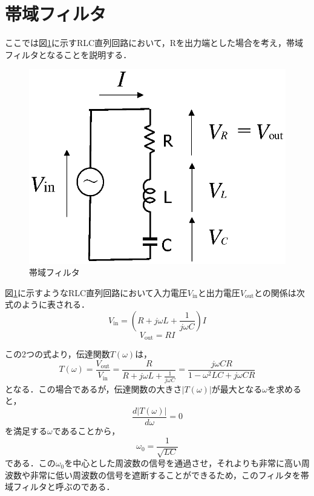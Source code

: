 \section{帯域フィルタ}

ここでは図\ref{fig:rlc01}に示すRLC直列回路において，Rを出力端とした場合を考え，帯域フィルタとなることを説明する．

\begin{figure}[H]
\begin{center}
\includegraphics[width=.4\textwidth]{fig/rlc0.eps}
\end{center}
\caption{帯域フィルタ}
\label{fig:rlc01}
\end{figure}

図\ref{fig:rlc01}に示すようなRLC直列回路において入力電圧$V_\textrm{in}$と出力電圧$V_\textrm{out}$との関係は次式のように表される．
\begin{equation}
V_\textrm{in}=\left ( R+j\omega L + \frac{1}{j\omega C} \right ) I
\label{eqn:denki-bpf1}
\end{equation}
\begin{equation}
V_\textrm{out} = R I
\label{eqn:denki-bpf2}
\end{equation}

この2つの式より，伝達関数$T(\omega)$は，
\begin{equation}
T(\omega)  =  \frac{V_\textrm{out}}{V_\textrm{in}} 
 = \frac{\displaystyle R}{\displaystyle R + j \omega L + \frac{1}{j\omega C}}
  = \frac{j\omega CR}{1-\omega^2LC + j\omega CR}
\end{equation}
となる．この場合であるが，伝達関数の大きさ$|T(\omega)|$が最大となる$\omega$を求めると，
\begin{equation}
\frac{d|T(\omega)|}{d\omega}=0
\end{equation}
を満足する$\omega$であることから，
\begin{equation}
\omega_0 = \frac{1}{\sqrt{LC}}
\end{equation}
である．この$\omega_0$を中心とした周波数の信号を通過させ，それよりも非常に高い周波数や非常に低い周波数の信号を遮断することができるため，このフィルタを帯域フィルタと呼ぶのである．


